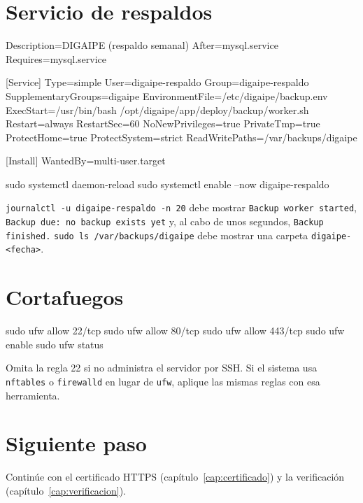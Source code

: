 \section{Servicio de respaldos}

\begin{codigo}[label={/etc/systemd/system/digaipe-respaldo.service}]
[Unit]
Description=DIGAIPE (respaldo semanal)
After=mysql.service
Requires=mysql.service

[Service]
Type=simple
User=digaipe-respaldo
Group=digaipe-respaldo
SupplementaryGroups=digaipe
EnvironmentFile=/etc/digaipe/backup.env
ExecStart=/usr/bin/bash /opt/digaipe/app/deploy/backup/worker.sh
Restart=always
RestartSec=60
NoNewPrivileges=true
PrivateTmp=true
ProtectHome=true
ProtectSystem=strict
ReadWritePaths=/var/backups/digaipe

[Install]
WantedBy=multi-user.target
\end{codigo}

\begin{codigo}
sudo systemctl daemon-reload
sudo systemctl enable --now digaipe-respaldo
\end{codigo}

\begin{comprobar}
	\texttt{journalctl -u digaipe-respaldo -n 20} debe mostrar
	\texttt{Backup worker started}, \texttt{Backup due: no backup exists yet} y, al cabo de unos
	segundos, \texttt{Backup finished.} \texttt{sudo ls /var/backups/digaipe} debe mostrar una
	carpeta \texttt{digaipe-<fecha>}.
\end{comprobar}

\section{Cortafuegos}

\begin{codigo}
sudo ufw allow 22/tcp
sudo ufw allow 80/tcp
sudo ufw allow 443/tcp
sudo ufw enable
sudo ufw status
\end{codigo}

Omita la regla 22 si no administra el servidor por SSH. Si el sistema usa \texttt{nftables} o
\texttt{firewalld} en lugar de \texttt{ufw}, aplique las mismas reglas con esa herramienta.

\section{Siguiente paso}

Continúe con el certificado HTTPS (capítulo~\ref{cap:certificado}) y la verificación
(capítulo~\ref{cap:verificacion}).

